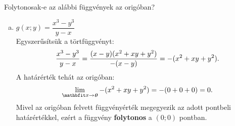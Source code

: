 \documentclass[exercise]{math-standalone}
\begin{document}
\begin{exercise}{Folytonosak-e az alábbi függvények az origóban?}
{\begin{enumerate}[a)]
      \item $g(x; y) = \dfrac{x^3 - y^3}{{y - x}}$\\[2mm]
            Egyszerűsítsük a törtfüggvényt:
            \[
              \frac{x^3 - y^3}{y - x} =
              \frac{(x - y)(x^2 + xy + y^2)}{-(x - y)} =
              -(x^2 + xy + y^2)
              \text.
            \]
            A határérték tehát az origóban:
            \[
              \lim_{\rvec x \rightarrow \nvec} -(x^2 + xy + y^2)
              = -(0 + 0 + 0)
              = 0
              \text.
            \]
            Mivel az origóban felvett függvényérték megegyezik az adott
            pontbeli határértékkel, ezért a függvény \textbf{folytonos} a
            $(0;0)$ pontban.
    \end{enumerate}
  }
\end{exercise}
\end{document}
